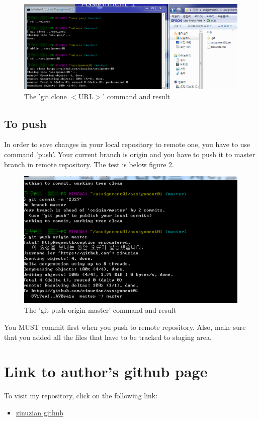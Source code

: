 \documentclass{article}
\begin{document}
    \begin{figure}[h!]
    \centering
    \includegraphics[scale=0.5]{git_clone_remote}
    \caption{The 'git clone $<$URL$>$' command and result}
    \label{fig:clone_remote}
    \end{figure}
    
    \pagebreak
    \subsection {To push}
    In order to save changes in your local repository to remote one, you have to use command 'push'. Your current branch is origin and you have to push it to master branch in remote repository. The test is below figure \ref{fig:push}.
    \begin{figure}[h!]
    \centering
    \includegraphics[scale=0.5]{git_push}
    \caption{The 'git push origin master' command and result}
    \label{fig:push}
    \end{figure}
    You MUST commit first when you push to remote repository. Also, make sure that you added all the files that have to be tracked to staging area.

\pagebreak
\section{Link to author's github page}
To visit my repository, click on the following link: 
\begin{itemize}
    \item \href{https://github.com/zinuzian/assignment01}{zinuzian github} \cite{github}
\end{itemize}
\end{document}

